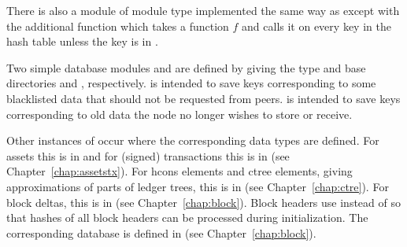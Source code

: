 There is also a module {} of module type {}
implemented the same way as {} except with the additional function {}
which takes a function $f$ and calls it on every key in the hash table {}
unless the key is in {}.

Two simple database modules {} and {}
are defined by giving {} the type {} and 
base directories {} and {}, respectively.
{} is intended to save keys corresponding to some blacklisted data that
should not be requested from peers.
{} is intended to save keys corresponding to old data the node no longer wishes
to store or receive.

Other instances of {}
occur where the corresponding data types are defined.
For assets this is in {}
and
for (signed) transactions this is in {}
(see Chapter~\ref{chap:assetstx}).
For hcons elements and ctree elements,
giving approximations of parts of ledger trees,
this is in {}
(see Chapter~\ref{chap:ctre}).
For block deltas,
this is in {}
(see Chapter~\ref{chap:block}).
Block headers use {} instead of {}
so that hashes of all block headers can be processed during initialization.
The corresponding database {}
is defined in {}
(see Chapter~\ref{chap:block}).
